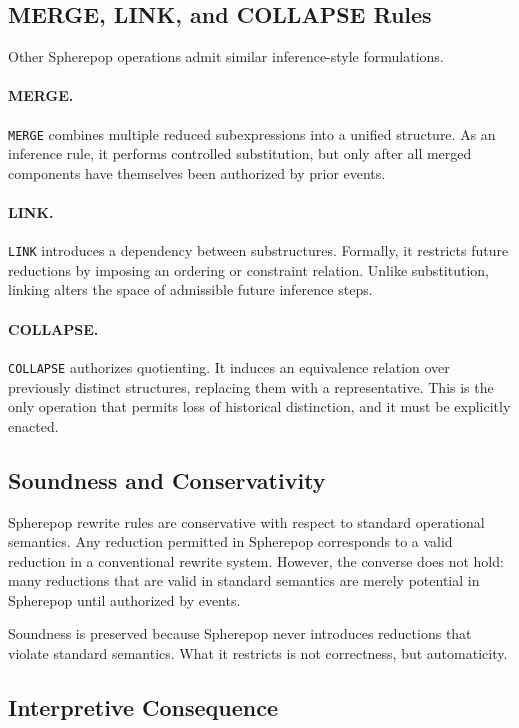 \documentclass[11pt]{article}
\begin{document}
\subsection{MERGE, LINK, and COLLAPSE Rules}

Other Spherepop operations admit similar inference-style formulations.

\paragraph{MERGE.}
\texttt{MERGE} combines multiple reduced subexpressions into a unified structure. As an inference rule, it performs controlled substitution, but only after all merged components have themselves been authorized by prior events.

\paragraph{LINK.}
\texttt{LINK} introduces a dependency between substructures. Formally, it restricts future reductions by imposing an ordering or constraint relation. Unlike substitution, linking alters the space of admissible future inference steps.

\paragraph{COLLAPSE.}
\texttt{COLLAPSE} authorizes quotienting. It induces an equivalence relation over previously distinct structures, replacing them with a representative. This is the only operation that permits loss of historical distinction, and it must be explicitly enacted.

\subsection{Soundness and Conservativity}

Spherepop rewrite rules are conservative with respect to standard operational semantics. Any reduction permitted in Spherepop corresponds to a valid reduction in a conventional rewrite system. However, the converse does not hold: many reductions that are valid in standard semantics are merely potential in Spherepop until authorized by events.

Soundness is preserved because Spherepop never introduces reductions that violate standard semantics. What it restricts is not correctness, but automaticity.

\subsection{Interpretive Consequence}
\end{document}
